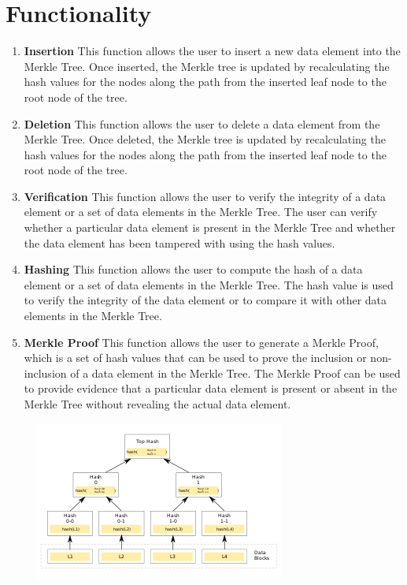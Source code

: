 \documentclass{article}
\begin{document}
\section{Functionality}
\begin{enumerate}
    \item \textbf{Insertion} This function allows the user to insert a new data element into the Merkle Tree. Once inserted, the Merkle tree is updated by recalculating the hash values for the nodes along the path from the inserted leaf node to the root node of the tree.
    \item \textbf{Deletion} This function allows the user to delete a data element from the Merkle Tree. Once deleted, the Merkle tree is updated by recalculating the hash values for the nodes along the path from the inserted leaf node to the root node of the tree.
    \item \textbf{Verification} This function allows the user to verify the integrity of a data element or a set of data elements in the Merkle Tree. The user can verify whether a particular data element is present in the Merkle Tree and whether the data element has been tampered with using the hash values.
    \item \textbf{Hashing} This function allows the user to compute the hash of a data element or a set of data elements in the Merkle Tree. The hash value is used to verify the integrity of the data element or to compare it with other data elements in the Merkle Tree.
    \item \textbf{Merkle Proof} This function allows the user to generate a Merkle Proof, which is a set of hash values that can be used to prove the inclusion or non-inclusion of a data element in the Merkle Tree. The Merkle Proof can be used to provide evidence that a particular data element is present or absent in the Merkle Tree without revealing the actual data element.
\end{enumerate}

\begin{figure}[h]
    \centering
    \includegraphics[scale = 1]{Hash_Tree.png}
\end{figure}
\end{document}
